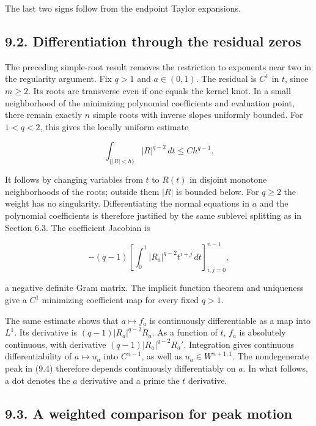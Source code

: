 \documentclass[11pt]{article}
\begin{document}
The last two signs follow from the endpoint Taylor expansions.

\subsection{9.2. Differentiation through the residual
zeros}\label{differentiation-through-the-residual-zeros}

The preceding simple-root result removes the restriction to exponents
near two in the regularity argument. Fix \(q>1\) and \(a\in(0,1)\). The
residual is \(C^1\) in \(t\), since \(m\ge2\). Its roots are transverse
even if one equals the kernel knot. In a small neighborhood of the
minimizing polynomial coefficients and evaluation point, there remain
exactly \(n\) simple roots with inverse slopes uniformly bounded. For
\(1<q<2\), this gives the locally uniform estimate

\[
\int_{\{|R|<h\}}|R|^{q-2}\,dt\le C h^{q-1}.
\tag{9.5}
\]

It follows by changing variables from \(t\) to \(R(t)\) in disjoint
monotone neighborhoods of the roots; outside them \(|R|\) is bounded
below. For \(q\ge2\) the weight has no singularity. Differentiating the
normal equations in \(a\) and the polynomial coefficients is therefore
justified by the same sublevel splitting as in Section 6.3. The
coefficient Jacobian is

\[
-(q-1)\left[\int_0^1|R_a|^{q-2}t^{i+j}\,dt\right]_{i,j=0}^{n-1},
\tag{9.6}
\]

a negative definite Gram matrix. The implicit function theorem and
uniqueness give a \(C^1\) minimizing coefficient map for every fixed
\(q>1\).

The same estimate shows that \(a\mapsto f_a\) is continuously
differentiable as a map into \(L^1\). Its derivative is
\((q-1)|R_a|^{q-2}\dot R_a\). As a function of \(t\), \(f_a\) is
absolutely continuous, with derivative \((q-1)|R_a|^{q-2}R_a'\).
Integration gives continuous differentiability of \(a\mapsto u_a\) into
\(C^{n-1}\), as well as \(u_a\in W^{n+1,1}\). The nondegenerate peak in
(9.4) therefore depends continuously differentiably on \(a\). In what
follows, a dot denotes the \(a\) derivative and a prime the \(t\)
derivative.

\subsection{9.3. A weighted comparison for peak
motion}\label{a-weighted-comparison-for-peak-motion}
\end{document}
